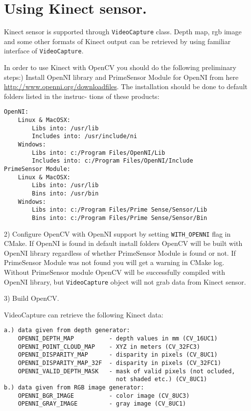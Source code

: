 

\ifCpp
\section{Using Kinect sensor.}

Kinect sensor is supported through \texttt{VideoCapture} class. Depth map, rgb image and some other formats of Kinect 
output can be retrieved by using familiar interface of \texttt{VideoCapture}.\par

In order to use Kinect with OpenCV you should do the following preliminary steps:) Install OpenNI library and PrimeSensor Module for OpenNI from here \url{http://www.openni.org/downloadfiles}. 
The installation should be done to default folders listed in the instruc-
tions of these products:
\begin{lstlisting}
OpenNI:
	Linux & MacOSX:
		Libs into: /usr/lib
		Includes into: /usr/include/ni
	Windows:
		Libs into: c:/Program Files/OpenNI/Lib
		Includes into: c:/Program Files/OpenNI/Include
PrimeSensor Module:
	Linux & MacOSX:
		Libs into: /usr/lib
		Bins into: /usr/bin
	Windows:
		Libs into: c:/Program Files/Prime Sense/Sensor/Lib
		Bins into: c:/Program Files/Prime Sense/Sensor/Bin
\end{lstlisting}
2) Configure OpenCV with OpenNI support by setting \texttt{WITH\_OPENNI} flag in CMake. If OpenNI
is found in default install folders OpenCV will be built with OpenNI library regardless of whether
PrimeSensor Module is found or not. If PrimeSensor Module was not found you will get a warning
in CMake log. Without PrimeSensor module OpenCV will be successfully compiled with OpenNI library, 
but \texttt{VideoCapture} object will not grab data from Kinect sensor. \par

3) Build OpenCV.\par

VideoCapture can retrieve the following Kinect data:
\begin{lstlisting}
a.) data given from depth generator:
	OPENNI_DEPTH_MAP          - depth values in mm (CV_16UC1)
	OPENNI_POINT_CLOUD_MAP    - XYZ in meters (CV_32FC3)
	OPENNI_DISPARITY_MAP      - disparity in pixels (CV_8UC1)
	OPENNI_DISPARITY_MAP_32F  - disparity in pixels (CV_32FC1)
	OPENNI_VALID_DEPTH_MASK   - mask of valid pixels (not ocluded,
                                not shaded etc.) (CV_8UC1)
b.) data given from RGB image generator:
	OPENNI_BGR_IMAGE          - color image (CV_8UC3)
	OPENNI_GRAY_IMAGE         - gray image (CV_8UC1)
\end{lstlisting}

